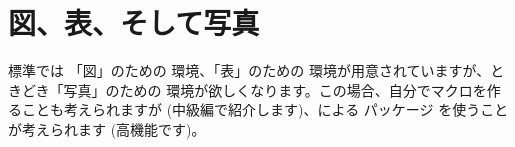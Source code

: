 %



\section{図、表、そして写真\texorpdfstring{\zdash}{---}}
\LaTeXe 標準では 「図」のための  環境、「表」のための
 環境が用意されていますが、ときどき「写真」のための 
環境が欲しくなります。この場合、自分でマクロを作ることも考えられますが 
(中級編で紹介します)、による  パッケージ
を使うことが考えられます (高機能です)。


